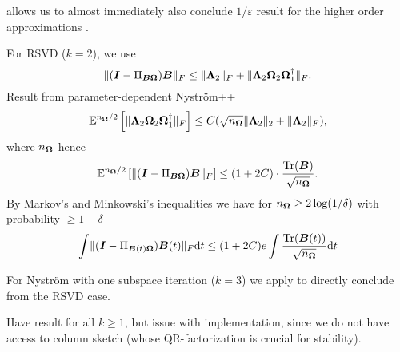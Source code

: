  allows us to almost immediately
also conclude $1/\varepsilon$ result for the higher order approximations
.

For RSVD ($k=2$), we use \cite[theorem~9.1]{halko2011finding}
\begin{equation}
    \lVert (\boldsymbol{I} - \Pi_{\boldsymbol{B}\boldsymbol{\Omega}}) \boldsymbol{B} \rVert _F \leq \lVert \boldsymbol{\Lambda}_2 \rVert _F + \lVert \boldsymbol{\Lambda}_2 \boldsymbol{\Omega}_2 \boldsymbol{\Omega}_1^{\dagger} \rVert _F.
\end{equation}
Result from parameter-dependent Nyström++ 
\begin{equation}
    \mathbb{E}^{n_{\mtx{\Omega}}/2} \left[ \lVert \mtx{\Lambda}_2 \mtx{\Omega}_2 \mtx{\Omega}_1^{\dagger} \rVert _F \right] \leq C(\sqrt{n_{\mtx{\Omega}}} \lVert \mtx{\Lambda}_2 \rVert _2 + \lVert \mtx{\Lambda}_2 \rVert _F),%
\end{equation}
where $n_{\boldsymbol{\Omega}}$ hence
\begin{equation}
    \mathbb{E}^{n_{\boldsymbol{\Omega}}/2} \left[ \lVert (\boldsymbol{I} - \Pi_{\boldsymbol{B}\boldsymbol{\Omega}}) \boldsymbol{B} \rVert _F \right]
    \leq (1 + 2C) \cdot \frac{\operatorname{Tr}(\boldsymbol{B})}{\sqrt{n_{\boldsymbol{\Omega}}}}.
\end{equation}
By Markov's and Minkowski's inequalities we have for $n_{\boldsymbol{\Omega}} \geq 2 \log(1/\delta)$ with probability $\geq 1 - \delta$
\begin{equation}
    \int \lVert  (\boldsymbol{I} - \Pi_{\boldsymbol{B}(t)\boldsymbol{\Omega}}) \boldsymbol{B}(t) \rVert _F \mathrm{d}t \leq (1 + 2C) e \int \frac{\operatorname{Tr}(\boldsymbol{B}(t))}{\sqrt{n_{\boldsymbol{\Omega}}}} \mathrm{d}t
\end{equation}

For Nystr\"om with one subspace iteration ($k=3$) we apply \cite[lemma~5.2]{tropp2023randomized}
to directly conclude from the RSVD case.

Have result for all $k \geq 1$, but issue with implementation, since we do not
have access to column sketch (whose QR-factorization is crucial for stability).

